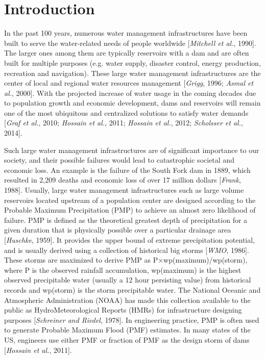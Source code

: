 \vspace{20mm}

\section{Introduction}
 
In the past 100 years, numerous water management infrastructures have been built to serve the water-related needs of people worldwide [\textit{Mitchell et al.}, 1990]. The larger ones among them are typically reservoirs with a dam and are often built for multiple purposes (e.g. water supply, disaster control, energy production, recreation and navigation). These large water management infrastructures are the center of local and regional water resources management [\textit{Grigg}, 1996; \textit{Asmal et al.}, 2000]. With the projected increase of water usage in the coming decades due to population growth and economic development, dams and reservoirs will remain one of the most ubiquitous and centralized solutions to satisfy water demands [\textit{Graf et al.}, 2010; \textit{Hossain et al.}, 2011; \textit{Hossain et al.}, 2012; \textit{Scholsser et al.}, 2014].

Such large water management infrastructures are of significant importance to our society, and their possible failures would lead to catastrophic societal and economic loss. An example is the failure of the South Fork dam in 1889, which resulted in 2,209 deaths and economic loss of over 17 million dollars [\textit{Frank}, 1988]. Usually, large water management infrastructures such as large volume reservoirs located upstream of a population center are designed according to the Probable Maximum Precipitation (PMP) to achieve an almost zero likelihood of failure. PMP is defined as the theoretical greatest depth of precipitation for a given duration that is physically possible over a particular drainage area [\textit{Huschke}, 1959].  It provides the upper bound of extreme precipitation potential, and is usually derived using a collection of historical big storms [\textit{WMO}, 1986]. These storms are maximized to derive PMP as P×wp(maximum)/wp(storm), where P is the observed rainfall accumulation, wp(maximum) is the highest observed precipitable water (usually a 12 hour persisting value) from historical records and wp(storm) is the storm precipitable water. The National Oceanic and Atmospheric Administration (NOAA) has made this collection available to the public as HydroMeteorological Reports (HMRs) for infrastructure designing purposes [\textit{Schreiner and Riedel}, 1978]. In engineering practice, PMP is often used to generate Probable Maximum Flood (PMF) estimates. In many states of the US, engineers use either PMF or fraction of PMF as the design storm of dams [\textit{Hossain et al.}, 2011].

